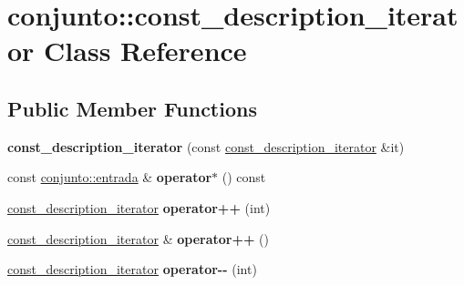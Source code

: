 \hypertarget{classconjunto_1_1const__description__iterator}{}\section{conjunto\+:\+:const\+\_\+description\+\_\+iterator Class Reference}
\label{classconjunto_1_1const__description__iterator}
\subsection*{Public Member Functions}
\begin{DoxyCompactItemize}
\item 
\hypertarget{classconjunto_1_1const__description__iterator_a9cadf7d501cd222b43d0d0df23e2c1e2}{}{\bfseries const\+\_\+description\+\_\+iterator} (const \hyperlink{classconjunto_1_1const__description__iterator}{const\+\_\+description\+\_\+iterator} \&it)\label{classconjunto_1_1const__description__iterator_a9cadf7d501cd222b43d0d0df23e2c1e2}

\item 
\hypertarget{classconjunto_1_1const__description__iterator_a1019941cb755ab1655ca637a3c8c4015}{}const \hyperlink{classconjunto_a09cad766dd65de73e51eae21f9d22585}{conjunto\+::entrada} \& {\bfseries operator$\ast$} () const \label{classconjunto_1_1const__description__iterator_a1019941cb755ab1655ca637a3c8c4015}

\item 
\hypertarget{classconjunto_1_1const__description__iterator_a5dc70298e2f2b3ef16ef12508731a186}{}\hyperlink{classconjunto_1_1const__description__iterator}{const\+\_\+description\+\_\+iterator} {\bfseries operator++} (int)\label{classconjunto_1_1const__description__iterator_a5dc70298e2f2b3ef16ef12508731a186}

\item 
\hypertarget{classconjunto_1_1const__description__iterator_a01fbd7ba089e91377a9945818a75cc2b}{}\hyperlink{classconjunto_1_1const__description__iterator}{const\+\_\+description\+\_\+iterator} \& {\bfseries operator++} ()\label{classconjunto_1_1const__description__iterator_a01fbd7ba089e91377a9945818a75cc2b}

\item 
\hypertarget{classconjunto_1_1const__description__iterator_a00864c18a313f9a651d9ba22fa3b44ca}{}\hyperlink{classconjunto_1_1const__description__iterator}{const\+\_\+description\+\_\+iterator} {\bfseries operator-\/-\/} (int)\label{classconjunto_1_1const__description__iterator_a00864c18a313f9a651d9ba22fa3b44ca}


\end{DoxyCompactItemize}
